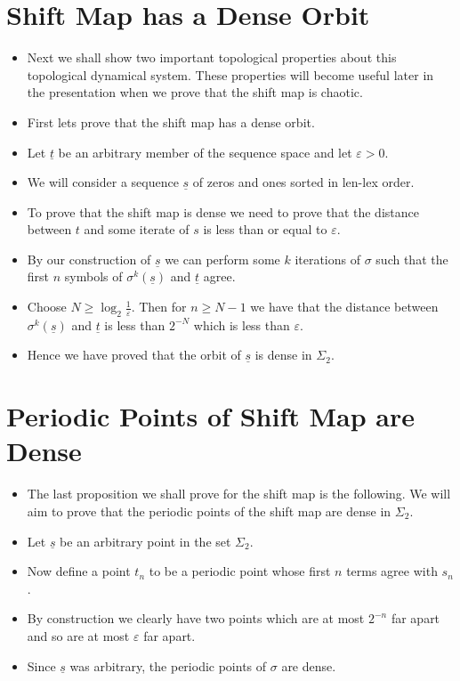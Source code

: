 \documentclass{article}
\begin{document}
    \section{Shift Map has a Dense Orbit}
    \begin{itemize}
        \item Next we shall show two important topological properties about this topological dynamical system. These properties will become useful later in the presentation when we prove that the shift map is chaotic.
        \item First lets prove that the shift map has a dense orbit.
        \item Let $\underline{t}$ be an arbitrary member of the sequence space and let $\varepsilon > 0$.
        \item We will consider a sequence $\underline{s}$ of zeros and ones sorted in len-lex order.
        \item To prove that the shift map is dense we need to prove that the distance between $t$ and some iterate of $s$ is less than or equal to $\varepsilon$.
        \item By our construction of $\underline{s}$ we can perform some $k$ iterations of $\sigma$ such that the first $n$ symbols of $\sigma^k(\underline{s})$ and $\underline{t}$ agree.
        \item Choose $N \geq \log_2{\frac{1}{\varepsilon}}$. Then for $n \geq N - 1$ we have that the distance between $\sigma^k(\underline{s})$ and $\underline{t}$ is less than $2^{-N}$ which is less than $\varepsilon$.
        \item Hence we have proved that the orbit of $\underline{s}$ is dense in $\Sigma_2$.
    \end{itemize}

    \section{Periodic Points of Shift Map are Dense}
    \begin{itemize}
        \item The last proposition we shall prove for the shift map is the following. We will aim to prove that the periodic points of the shift map are dense in $\Sigma_2$.
        \item Let $\underline{s}$ be an arbitrary point in the set $\Sigma_2$.
        \item Now define a point $t_n$ to be a periodic point whose first $n$ terms agree with $s_n$.
        \item By construction we clearly have two points which are at most $2^{-n}$ far apart and so are at most $\varepsilon$ far apart. 
        \item Since $\underline{s}$ was arbitrary, the periodic points of $\sigma$ are dense.
    \end{itemize}
\end{document}
